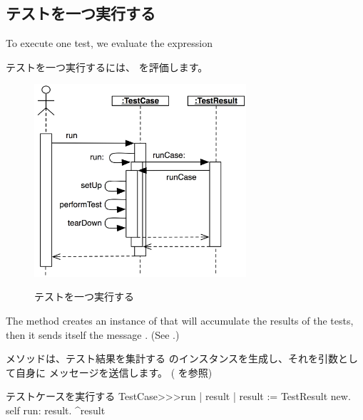 \documentclass[a4paper,10pt,twoside]{book}
\begin{document}
\subsection{テストを一つ実行する}

To execute one test, we evaluate the expression
\fi

テストを一つ実行するには、  を評価します。

\begin{figure}[tbh]
  \begin{center}
		{\includegraphics[width=0.7\textwidth]{sunit-scenario}}
	\caption{テストを一つ実行する}
  \end{center}
\end{figure}

The method  creates an instance of
 that will accumulate the results of the
tests, then it sends itself the message .
(See .)
\fi

 メソッドは、テスト結果を集計する  のインスタンスを生成し、それを引数として自身に  メッセージを送信します。
( を参照)

\begin{method}[tastecaserun]{テストケースを実行する}
TestCase>>>run
	| result |
	result := TestResult new.
	self run: result.
	^result
\end{method}

\end{document}
